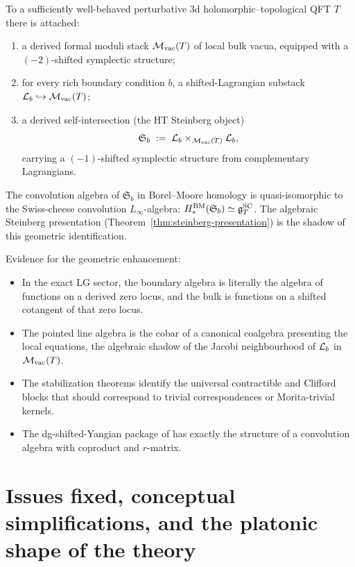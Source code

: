 \begin{conjecture}
To a sufficiently well-behaved perturbative 3d
holomorphic--topological QFT $T$ there is attached:
\begin{enumerate}[label=\textup{(\alph*)}]
\item a derived formal moduli stack $\mathcal M_{\mathrm{vac}}(T)$ of
 local bulk vacua, equipped with a $(-2)$-shifted symplectic
 structure;
\item for every rich boundary condition $b$, a shifted-Lagrangian
 substack $\mathcal L_b \hookrightarrow \mathcal M_{\mathrm{vac}}(T)$;
\item a derived self-intersection (the HT Steinberg object)
 \[
 \mathfrak S_b
 \;:=\;
 \mathcal L_b \times_{\mathcal M_{\mathrm{vac}}(T)} \mathcal L_b,
 \]
 carrying a $(-1)$-shifted symplectic structure from
 complementary Lagrangians.
\end{enumerate}
The convolution algebra of $\mathfrak S_b$ in Borel--Moore homology
is quasi-isomorphic to the Swiss-cheese convolution $L_\infty$-algebra:
$H_*^{\mathrm{BM}}(\mathfrak S_b) \simeq \mathfrak{g}^{\mathrm{SC}}_T$.
The algebraic Steinberg presentation
\textup{(}Theorem~\textup{\ref{thm:steinberg-presentation}}\textup{)}
is the shadow of this geometric identification.
\end{conjecture}

Evidence for the geometric enhancement:
\begin{itemize}[leftmargin=1.8em]
\item In the exact LG sector, the boundary algebra is literally
 the algebra of functions on a derived zero locus, and the bulk
 is functions on a shifted cotangent of that zero locus.
\item The pointed line algebra is the cobar of a canonical coalgebra
 presenting the local equations, the algebraic shadow of the
 Jacobi neighbourhood of $\mathcal L_b$ in $\mathcal M_{\mathrm{vac}}(T)$.
\item The stabilization theorems identify the universal contractible
 and Clifford blocks that should correspond to trivial
 correspondences or Morita-trivial kernels.
\item The dg-shifted-Yangian package of \cite{DNP25} has exactly
 the structure of a convolution algebra with coproduct and
 $r$-matrix.
\end{itemize}


\section{Issues fixed, conceptual simplifications, and the platonic shape of the theory}

